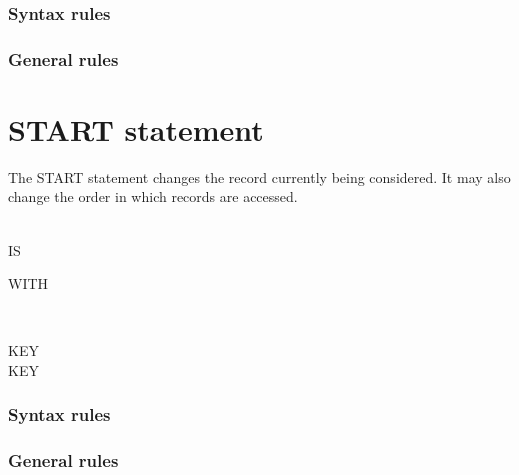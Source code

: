 \subsubsection{Syntax rules}

\subsubsection{General rules}

\section{START statement}

The START statement changes the record currently being considered. It may also change the order in which records are accessed.

\begin{syntax}
   \filename
  \begin{0-1}
     \\

     IS  \identifier \\

  \end{0-1}

  \begin{0-1}
    WITH
    \begin{1=}
       \\
    \end{1=}
    \arithmeticexpression
  \end{0-1}

  \begin{0+}
     KEY \imperativestatement \\
      KEY \imperativestatement
  \end{0+}

  \begin{0-1}
  \end{0-1}
\end{syntax}

\subsubsection{Syntax rules}

\subsubsection{General rules}

